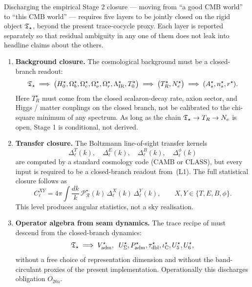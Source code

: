 \begin{remark}
\label{rem:five-layer-roadmap}
Discharging the empirical Stage 2 closure --- moving from ``a good CMB world'' to ``this CMB
world'' --- requires five layers to be jointly closed on the rigid object $\mathfrak T_{\star}$, beyond the
present trace-cocycle proxy. Each layer is reported separately so that residual ambiguity in any
one of them does not leak into headline claims about the others.

\begin{enumerate}[label=(L\arabic*),leftmargin=2.4em,topsep=3pt,itemsep=2pt]
\item \textbf{Background closure.} The cosmological background must be a closed-branch readout:
\[
\mathfrak T_{\star}
\;\Longrightarrow\;
\bigl(H_0^\star,\Omega_b^\star,\Omega_c^\star,\Omega_\nu^\star,\Omega_r^\star,
\Lambda_{\mathrm{IR}}^\star,T_0^\star\bigr)
\;\Longrightarrow\;
\bigl(T_R^\star,N_e^\star\bigr)
\;\Longrightarrow\;
(A_s^\star,n_s^\star,r^\star).
\]
Here $T_R^\star$ must come from the closed scalaron-decay rate, axion sector, and Higgs / matter
couplings on the closed branch, not be calibrated to the chi-square minimum of any spectrum. As
long as the chain $\mathfrak T_{\star}\to T_R\to N_e$ is open, Stage 1 is conditional, not derived.

\item \textbf{Transfer closure.} The Boltzmann line-of-sight transfer kernels
\[
\Delta_\ell^T(k),\quad
\Delta_\ell^E(k),\quad
\Delta_\ell^B(k),\quad
\Delta_\ell^{\phi}(k)
\]
are computed by a standard cosmology code (CAMB or CLASS), but every input is required to be a
closed-branch readout from~(L1). The full statistical closure follows as
\[
C_\ell^{XY}
=4\pi\int\frac{dk}{k}\,\mathcal P_{\mathcal R}^\star(k)\,
\Delta_\ell^X(k)\,\Delta_\ell^Y(k),
\qquad X,Y\in\{T,E,B,\phi\}.
\]
This level produces angular statistics, not a sky realisation.

\item \textbf{Operator algebra from seam dynamics.} The trace recipe of
 must descend from the closed-branch dynamics:
\[
\mathfrak T_{\star}
\;\Longrightarrow\;
V_{\mathrm{adm}}^\star,\;\;
U_\Sigma^\star,P_{\mathrm{adm}}^\star,\tau_{\mathrm{dbl}}^\star,\iota_{\mathrm C}^\star,U_5^\star,U_6^\star,
\]
without a free choice of representation dimension and without the band-circulant proxies of the
present implementation. Operationally this discharges obligation $O_{20\mathrm{a}}$.


\end{enumerate}
\end{remark}
